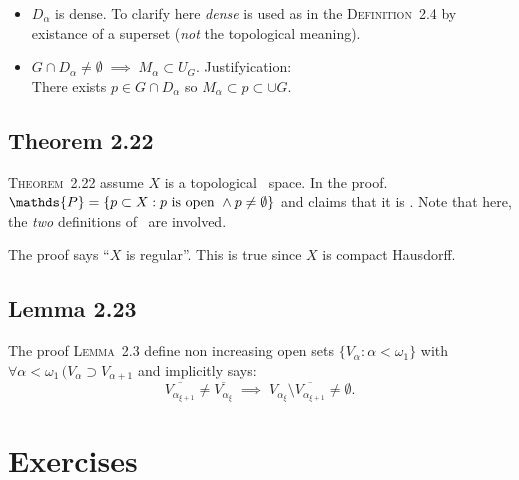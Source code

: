 \begin{itemize}
\item \(D_\alpha\) is dense. To clarify here \emph{dense} 
  is used as in the \textsc{Definition}~2.4
  by existance of a superset (\emph{not} the topological meaning).

\item \(G\cap D_\alpha\neq\emptyset\;\implies\; M_\alpha \subset U_G\).
   Justifyication:\\
   There exists \(p \in G\cap D_\alpha\) so \(M_\alpha \subset p \subset \cup G\).

\end{itemize}

\subsection{Theorem 2.22}

\textsc{Theorem}~2.22 assume $X$ is a topological \ccc\ space.
In the proof. 
\(\mathds{P} = \{p\subset X: p\textnormal{ is open } \land p\neq\emptyset\}\) 
and claims that it is \ccc. 
Note that here, the \emph{two} definitions of \ccc\ are involved.

The proof says ``$X$ is regular''. This is true
since $X$ is compact Hausdorff.

\subsection{Lemma 2.23}

The proof \textsc{Lemma}~2.3 
define non increasing open sets \(\{V_\alpha:\alpha<\omega_1\}\)
with \(\forall \alpha<\omega_1\,(V_\alpha \supset V_{\alpha+1}\)
and implicitly says:
\begin{equation*}
\overline{V_{\alpha_{\xi+1}}} \neq \overline{V_{\alpha_\xi}} 
\;\implies\;
V_{\alpha_\xi} \setminus \overline{V_{\alpha_{\xi+1}}} \neq \emptyset.
\end{equation*}

\section{Exercises}

